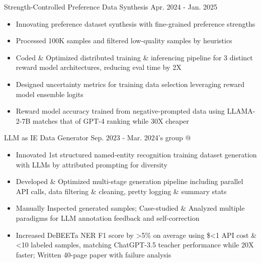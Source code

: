\cveventSameLine{}
    {Strength-Controlled Preference Data Synthesis}
    {Apr. 2024 - Jan. 2025}{}
\begin{itemize}

    \item Innovating preference dataset synthesis with fine-grained preference strengths

    \item Processed 100K samples and filtered low-quality samples by heuristics

    \item Coded \& Optimized distributed training \& inferencing pipeline for 3 distinct reward model architectures, reducing eval time by 2X

    \item Designed uncertainty metrics for training data selection leveraging reward model ensemble logits

    \item Reward model accuracy trained from negative-prompted data using LLAMA-2-7B matches that of GPT-4 ranking while 30X cheaper
\end{itemize}
\dividerSmall


\cveventSameLine{}
    {LLM as IE Data Generator}
    {Sep. 2023 - Mar. 2024}{'s group @ }
\begin{itemize}

    \item Innovated 1st structured named-entity recognition training dataset generation with LLMs by attributed prompting for diversity

    \item Developed \& Optimized multi-stage generation pipeline including parallel API calls, data filtering \& cleaning, pretty logging \& summary stats

    \item Manually Inspected generated samples; Case-studied \& Analyzed multiple paradigms for LLM annotation feedback and self-correction

    \item Increased DeBEETa NER F1 score by >5\% on average using \$<1 API cost \& <10 labeled samples,
    matching ChatGPT-3.5 teacher performance while 20X faster; Written 40-page paper with failure analysis
\end{itemize}
\dividerSmall


